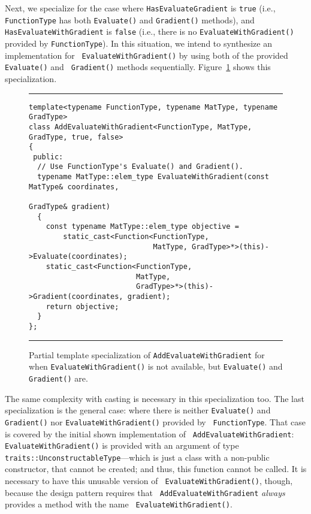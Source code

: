 Next, we specialize for the case where {\tt HasEvaluateGradient} is {\tt true}
(i.e., {\tt FunctionType} has both {\tt Evaluate()} and {\tt Gradient()}
methods), and {\tt HasEvaluateWithGradient} is {\tt false} (i.e., there is no
{\tt EvaluateWithGradient()} provided by {\tt FunctionType}).  In this
situation, we intend to synthesize an implementation for {\tt
EvaluateWithGradient()} by using both of the provided {\tt Evaluate()} and {\tt
Gradient()} methods sequentially.  Figure~\ref{fig:aewg-s2} shows this
specialization.

\begin{figure}[t!]
\hrule
\vspace{1ex}
\begin{verbatim}
template<typename FunctionType, typename MatType, typename GradType>
class AddEvaluateWithGradient<FunctionType, MatType, GradType, true, false>
{
 public:
  // Use FunctionType's Evaluate() and Gradient().
  typename MatType::elem_type EvaluateWithGradient(const MatType& coordinates,
                                                   GradType& gradient)
  {
    const typename MatType::elem_type objective =
        static_cast<Function<FunctionType,
                             MatType, GradType>*>(this)->Evaluate(coordinates);
    static_cast<Function<FunctionType,
                         MatType,
                         GradType>*>(this)->Gradient(coordinates, gradient);
    return objective;
  }
};
\end{verbatim}
\hrule
\vspace*{-0.5em}
\caption{Partial template specialization of {\tt AddEvaluateWithGradient} for
when {\tt EvaluateWithGradient()} is not available, but {\tt Evaluate()} and
{\tt Gradient()} are.}
\label{fig:aewg-s2}
\end{figure}

The same complexity with casting is necessary in this specialization too.  The
last specialization is the general case: where there is neither {\tt Evaluate()}
and {\tt Gradient()} nor {\tt EvaluateWithGradient()} provided by {\tt
FunctionType}.  That case is covered by the initial shown implementation of {\tt
AddEvaluateWithGradient}: {\tt EvaluateWithGradient()} is provided with an
argument of type {\tt traits::UnconstructableType}---which is just a class with
a non-public constructor, that cannot be created; and thus, this function cannot
be called.  It is necessary to have this unusable version of {\tt
EvaluateWithGradient()}, though, because the design pattern requires that {\tt
AddEvaluateWithGradient} {\em always} provides a method with the name {\tt
EvaluateWithGradient()}.

